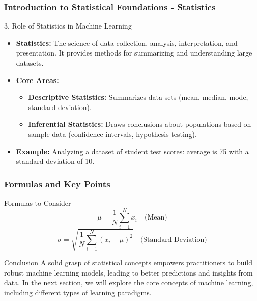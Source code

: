 \documentclass{beamer}
\begin{document}
\begin{frame}[fragile]
    \frametitle{Introduction to Statistical Foundations - Statistics}
    \begin{block}{3. Role of Statistics in Machine Learning}
        \begin{itemize}
            \item \textbf{Statistics:} The science of data collection, analysis, interpretation, and presentation. It provides methods for summarizing and understanding large datasets.
            \item \textbf{Core Areas:}
            \begin{itemize}
                \item \textbf{Descriptive Statistics:} Summarizes data sets (mean, median, mode, standard deviation).
                \item \textbf{Inferential Statistics:} Draws conclusions about populations based on sample data (confidence intervals, hypothesis testing).
            \end{itemize}
            \item \textbf{Example:} Analyzing a dataset of student test scores: average is 75 with a standard deviation of 10.
        \end{itemize}
    \end{block}
\end{frame}

\begin{frame}[fragile]
    \frametitle{Formulas and Key Points}
    \begin{block}{Formulas to Consider}
        \begin{equation}
            \mu = \frac{1}{N} \sum_{i=1}^{N} x_i \quad \text{(Mean)}
        \end{equation}
        \begin{equation}
            \sigma = \sqrt{\frac{1}{N} \sum_{i=1}^{N} (x_i - \mu)^2} \quad \text{(Standard Deviation)}
        \end{equation}
    \end{block}
    
    \begin{block}{Conclusion}
        A solid grasp of statistical concepts empowers practitioners to build robust machine learning models, leading to better predictions and insights from data. In the next section, we will explore the core concepts of machine learning, including different types of learning paradigms.
    \end{block}
\end{frame}
\end{document}
